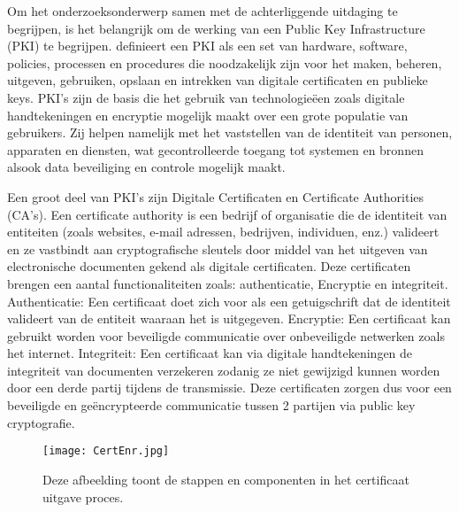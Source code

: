Om het onderzoeksonderwerp samen met de achterliggende uitdaging te begrijpen, is het belangrijk om de werking van een Public Key Infrastructure (PKI) te begrijpen.
\textcite{Thales2025} definieert een PKI als een set van hardware, software, policies, processen en procedures die noodzakelijk zijn voor het maken, beheren, uitgeven, gebruiken, opslaan en intrekken van digitale certificaten en publieke keys.
PKI's zijn de basis die het gebruik van technologieëen zoals digitale handtekeningen en encryptie mogelijk maakt over een grote populatie van gebruikers.
Zij helpen namelijk met het vaststellen van de identiteit van personen, apparaten en diensten, wat gecontrolleerde toegang tot systemen en bronnen alsook data beveiliging en controle mogelijk maakt. \break

Een groot deel van PKI's zijn Digitale Certificaten en Certificate Authorities (CA's).
Een certificate authority is een bedrijf of organisatie die de identiteit van entiteiten (zoals websites, e-mail adressen, bedrijven, individuen, enz.) valideert en ze vastbindt aan cryptografische sleutels door middel van het uitgeven van electronische documenten gekend als digitale certificaten.
Deze certificaten brengen een aantal functionaliteiten zoals: authenticatie, Encryptie en integriteit.
Authenticatie: Een certificaat doet zich voor als een getuigschrift dat de identiteit valideert van de entiteit waaraan het is uitgegeven.
Encryptie: Een certificaat kan gebruikt worden voor beveiligde communicatie over onbeveiligde netwerken zoals het internet.
Integriteit: Een certificaat kan via digitale handtekeningen de integriteit van documenten verzekeren zodanig ze niet gewijzigd kunnen worden door een derde partij tijdens de transmissie.
Deze certificaten zorgen dus voor een beveiligde en geëncrypteerde communicatie tussen 2 partijen via public key cryptografie. \autocite{SSLcom} \break

\begin{figure}
  \centering
  \texttt{[image: CertEnr.jpg]}
  \caption[Certificate enrollment.]{\label{fig:certenr}Deze afbeelding toont de stappen en componenten in het certificaat uitgave proces.}
\end{figure}


